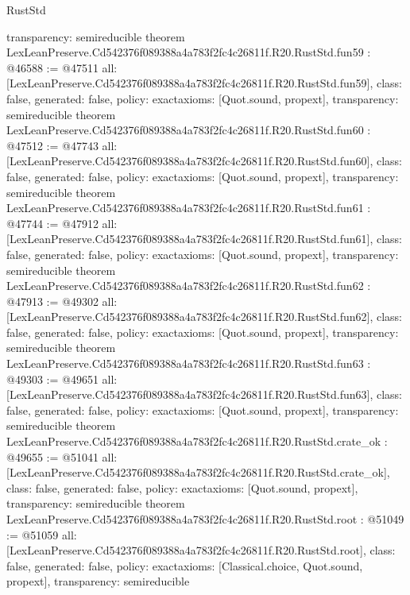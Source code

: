 \begin{lexlean}{RustStd}
\begin{coremodule}
{  transparency: semireducible
}
theorem LexLeanPreserve.Cd542376f089388a4a783f2fc4c26811f.R20.RustStd.fun59 : @46588 := @47511 {
  all: [LexLeanPreserve.Cd542376f089388a4a783f2fc4c26811f.R20.RustStd.fun59],
  class: false,
  generated: false,
  policy: exact{axioms: [Quot.sound, propext]},
  transparency: semireducible
}
theorem LexLeanPreserve.Cd542376f089388a4a783f2fc4c26811f.R20.RustStd.fun60 : @47512 := @47743 {
  all: [LexLeanPreserve.Cd542376f089388a4a783f2fc4c26811f.R20.RustStd.fun60],
  class: false,
  generated: false,
  policy: exact{axioms: [Quot.sound, propext]},
  transparency: semireducible
}
theorem LexLeanPreserve.Cd542376f089388a4a783f2fc4c26811f.R20.RustStd.fun61 : @47744 := @47912 {
  all: [LexLeanPreserve.Cd542376f089388a4a783f2fc4c26811f.R20.RustStd.fun61],
  class: false,
  generated: false,
  policy: exact{axioms: [Quot.sound, propext]},
  transparency: semireducible
}
theorem LexLeanPreserve.Cd542376f089388a4a783f2fc4c26811f.R20.RustStd.fun62 : @47913 := @49302 {
  all: [LexLeanPreserve.Cd542376f089388a4a783f2fc4c26811f.R20.RustStd.fun62],
  class: false,
  generated: false,
  policy: exact{axioms: [Quot.sound, propext]},
  transparency: semireducible
}
theorem LexLeanPreserve.Cd542376f089388a4a783f2fc4c26811f.R20.RustStd.fun63 : @49303 := @49651 {
  all: [LexLeanPreserve.Cd542376f089388a4a783f2fc4c26811f.R20.RustStd.fun63],
  class: false,
  generated: false,
  policy: exact{axioms: [Quot.sound, propext]},
  transparency: semireducible
}
theorem LexLeanPreserve.Cd542376f089388a4a783f2fc4c26811f.R20.RustStd.crate_ok : @49655 := @51041 {
  all: [LexLeanPreserve.Cd542376f089388a4a783f2fc4c26811f.R20.RustStd.crate_ok],
  class: false,
  generated: false,
  policy: exact{axioms: [Quot.sound, propext]},
  transparency: semireducible
}
theorem LexLeanPreserve.Cd542376f089388a4a783f2fc4c26811f.R20.RustStd.root : @51049 := @51059 {
  all: [LexLeanPreserve.Cd542376f089388a4a783f2fc4c26811f.R20.RustStd.root],
  class: false,
  generated: false,
  policy: exact{axioms: [Classical.choice, Quot.sound, propext]},
  transparency: semireducible
}


\end{coremodule}
\end{lexlean}
